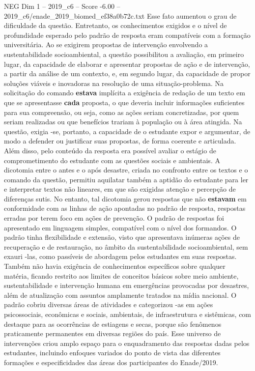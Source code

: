 \begin{textsample}{NEG Dim 1 – 2019\_c6 – Score -6.00 – 2019\_c6/enade\_2019\_biomed\_ef38a0b72c.txt}
Esse fato aumentou o grau de dificuldade da questão.
Entretanto, os conhecimentos exigidos e o nível de profundidade esperado pelo padrão de resposta eram compatíveis com a formação universitária.
Ao se exigirem propostas de intervenção envolvendo a sustentabilidade socioambiental, a questão possibilitou a avaliação, em primeiro lugar, da capacidade de elaborar e apresentar propostas de ação e de intervenção, a partir da análise de um contexto, e, em segundo lugar, da capacidade de propor soluções viáveis e inovadoras na resolução de uma situação-problema.
Na solicitação do comando \textbf{estava} implícita a exigência de redação de um texto em que se apresentasse \textbf{cada} proposta, o que deveria incluir informações suficientes para sua compreensão, ou seja, como as ações seriam concretizadas, por quem seriam realizadas ou que benefícios trariam à população ou à área atingida.
Na questão, exigia -se, portanto, a capacidade de o estudante expor e argumentar, de modo a defender ou justificar suas propostas, de forma coerente e articulada.
Além disso, pelo conteúdo da resposta era possível avaliar o estágio de comprometimento do estudante com as questões sociais e ambientais.
A dicotomia entre o antes e o após desastre, criada no confronto entre os textos e o comando da questão, permitiu aquilatar também a aptidão do estudante para ler e interpretar textos não lineares, em que são exigidas atenção e percepção de diferenças sutis.
No entanto, tal dicotomia gerou respostas que não \textbf{estavam} em conformidade com as linhas de ação apontadas no padrão de resposta, respostas erradas por terem foco em ações de prevenção.
O padrão de respostas foi apresentado em linguagem simples, compatível com o nível dos formandos.
O padrão tinha flexibilidade e extensão, visto que apresentava inúmeras ações de recuperação e de restauração, no âmbito da sustentabilidade socioambiental, sem exauri -las, como passíveis de abordagem pelos estudantes em suas respostas.
Também não havia exigência de conhecimentos específicos sobre qualquer matéria, ficando restrito aos limites de conceitos básicos sobre meio ambiente, sustentabilidade e intervenção humana em emergências provocadas por desastres, além de atualização com assuntos amplamente tratados na mídia nacional.
O padrão cobriu diversas áreas de atividades e categorizou -as em ações psicossociais, econômicas e sociais, ambientais, de infraestrutura e sistêmicas, com destaque para as ocorrências de estiagens e secas, porque são fenômenos praticamente permanentes em diversas regiões do país.
Esse universo de intervenções criou amplo espaço para o enquadramento das respostas dadas pelos estudantes, incluindo enfoques variados do ponto de vista das diferentes formações e especificidades das áreas dos participantes do Enade/2019.

\end{textsample}
